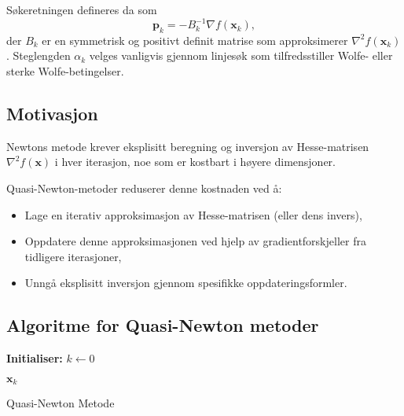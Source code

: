 Søkeretningen defineres da som
\[
	\symbf{p}_k = -B_k^{-1} \nabla f(\symbf{x}_k),
\]
der \( B_k \) er en symmetrisk og positivt definit matrise som approksimerer \( \nabla^2 f(\symbf{x}_k) \). Steglengden \( \alpha_k \) velges vanligvis gjennom linjesøk som tilfredsstiller Wolfe- eller sterke Wolfe-betingelser.

\subsection{Motivasjon}
Newtons metode krever eksplisitt beregning og inversjon av Hesse-matrisen \( \nabla^2 f(\symbf{x}) \) i hver iterasjon, noe som er kostbart i høyere dimensjoner.

Quasi-Newton-metoder reduserer denne kostnaden ved å:
\begin{itemize}
	\item Lage en iterativ approksimasjon av Hesse-matrisen (eller dens invers),
	\item Oppdatere denne approksimasjonen ved hjelp av gradientforskjeller fra tidligere iterasjoner,
	\item Unngå eksplisitt inversjon gjennom spesifikke oppdateringsformler.
\end{itemize}

\subsection{Algoritme for Quasi-Newton metoder}

\begin{algorithm}[H]
	\DontPrintSemicolon

	\textbf{Initialiser:} \( k \gets 0 \)\;

	\Return \( \mathbf{x}_k \)\;
	\caption{Quasi-Newton Metode}
	\label{alg:quasi_newton}
\end{algorithm}

